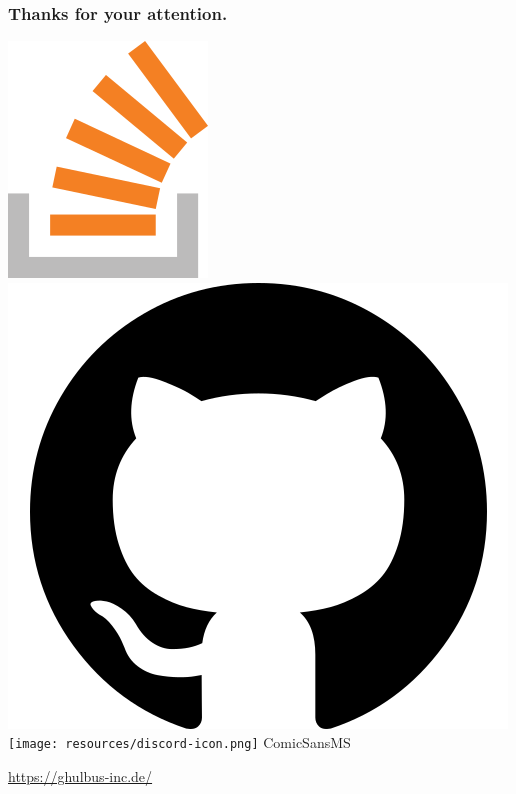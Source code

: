 \documentclass[aspectratio=169]{beamer}
\begin{document}
\begin{frame}
  \frametitle{Thanks for your attention.}

  \href{https://stackoverflow.com/users/577603/comicsansms}{\includegraphics[height=.05\textheight]{resources/so-icon.png}}
  \href{https://github.com/ComicSansMS}{\includegraphics[height=.05\textheight]{resources/github-icon.png}}
  \texttt{[image: resources/discord-icon.png]} ComicSansMS
  
  \vspace{15pt}
  \href{https://ghulbus-inc.de/}{https://ghulbus-inc.de/}

\end{frame}
\end{document}
